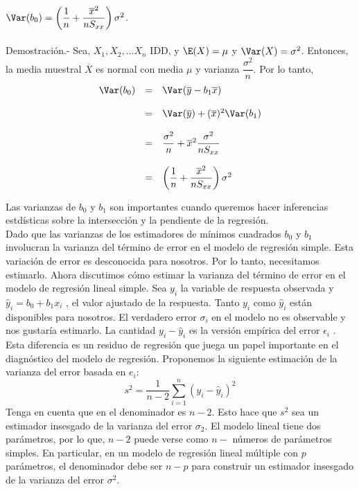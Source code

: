 \begin{teo}
    $\Var(b_0) = \left(\dfrac{1}{n}+\dfrac{\overline{x}^2}{nS_{xx}}\right)\sigma^2$.\\\\
    Demostración.-\; Sea, $X_1,X_2,\ldots X_n$ IDD, y  $\E(X)=\mu$ y $\Var(X)=\sigma^2$. Entonces, la media muestral $\overline{X}$ es normal con media $\mu$ y varianza $\dfrac{\sigma^2}{n}.$ Por lo tanto,
	$$
	\begin{array}{rcl}
	    \Var(b_0) &=& \Var(\overline{y}-b_1\overline{x})\\\\
		      &=& \Var(\overline{y})+(\overline{x})^2\Var(b_1)\\\\
		      &=& \dfrac{\sigma^2}{n}+ \overline{x}^2 \dfrac{\sigma^2}{nS_{xx}}\\\\
		      &=& \left(\dfrac{1}{n}+\dfrac{\overline{x}^2}{nS_{xx}}\right)\sigma^2
	\end{array}
	$$
\end{teo}

Las varianzas de $b_0$ y $b_1$ son importantes cuando queremos hacer inferencias estdísticas sobre la intersección y la pendiente de la regresión.\\

Dado que las varianzas de los estimadores de mínimos cuadrados $b_0$ y $b_1$ involucran la varianza del término de error en el modelo de regresión simple. Esta variación de error es desconocida para nosotros. Por lo tanto, necesitamos estimarlo. Ahora discutimos cómo estimar la varianza del término de error en el modelo de regresión lineal simple. Sea $y_i$ la variable de respuesta observada y $\hat{y}_i = b_0 + b_1x_i$ , el valor ajustado de la respuesta. Tanto $y_i$ como $\hat{y}_i$ están disponibles para nosotros. El verdadero error $\sigma_i$ en el modelo no es observable y nos gustaría estimarlo. La cantidad $y_i - \hat{y}_i$ es la versión empírica del error $\epsilon_i$ . Esta diferencia es un residuo de regresión que juega un papel importante en el diagnóstico del modelo de regresión. Proponemos la siguiente estimación de la varianza del error basada en $e_i$:
$$s^2 = \dfrac{1}{n-2}\sum_{i=1}^n \left(y_i-\hat{y}_i\right)^2$$
Tenga en cuenta que en el denominador es $n-2$. Esto hace que $s^2$ sea un estimador insesgado de la varianza del error $\sigma_2$. El modelo lineal tiene dos parámetros, por lo que, $n-2$ puede verse como $n-$ números de parámetros simples. En particular, en un modelo de regresión lineal múltiple con $p$ parámetros, el denominador debe ser $n - p$ para construir un estimador insesgado de la varianza del error $\sigma^2$.\\


